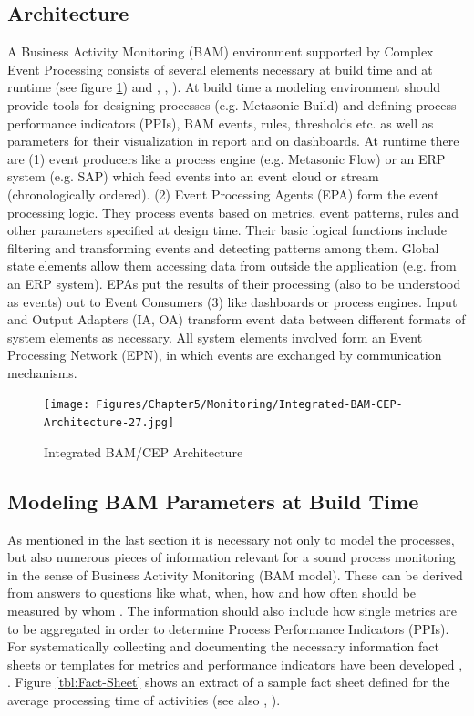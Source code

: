 \subsection{Architecture }
A Business Activity Monitoring (BAM) environment supported by Complex Event Processing consists of several elements necessary at build time and at runtime (see figure \ref{fig:BAMArchitecture}) and \cite{book:processmonitoring}, \cite{book:CEPinAction} , \cite{article:BlueprintEventBPM}). At build time a modeling environment should provide tools for designing processes (e.g. Metasonic Build) and defining process performance indicators (PPIs), BAM events, rules, thresholds etc. as well as parameters for their visualization in report and on dashboards. At runtime there are (1) event producers like a process engine (e.g. Metasonic Flow) or an ERP system (e.g. SAP) which feed events into an event cloud or stream (chronologically ordered). (2) Event Processing Agents (EPA) form the event processing logic. They process events based on metrics, event patterns, rules and other parameters specified at design time. Their basic logical functions include filtering and transforming events and detecting patterns among them. Global state elements allow them accessing data from outside the application (e.g. from an ERP system). EPAs put the results of their processing (also to be understood as events) out to Event Consumers (3) like dashboards or process engines. Input and Output Adapters (IA, OA) transform event data between different formats of system elements as necessary. All system elements involved form an Event Processing Network (EPN), in which events are exchanged by communication mechanisms.

\begin{figure}[htbp]
	\centering
	\texttt{[image: Figures/Chapter5/Monitoring/Integrated-BAM-CEP-Architecture-27.jpg]}
	\caption[Integrated BAM/CEP Architecture 27]{Integrated BAM/CEP Architecture \cite{book:processmonitoring}}
	\label{fig:BAMArchitecture}
\end{figure}



\subsection{Modeling BAM Parameters at Build Time}
As mentioned in the last section it is necessary not only to model the processes, but also numerous pieces of information relevant for a sound process monitoring in the sense of Business Activity Monitoring (BAM model). These can be derived from answers to questions like what, when, how and how often should be measured by whom \cite{book:ProzesseSchmelzer}. The information should also include how single metrics are to be aggregated in order to determine Process Performance Indicators (PPIs). For systematically collecting and documenting the necessary information fact sheets or templates for metrics and performance indicators have been developed \cite{book:KennzahlenIT}, \cite{book:ITControlling}. Figure \ref{tbl:Fact-Sheet}  shows an extract of a sample fact sheet defined for the average processing time of activities (see also \cite{article:SBPMCosting}, \cite{book:MonitoringSubjekt} ).



